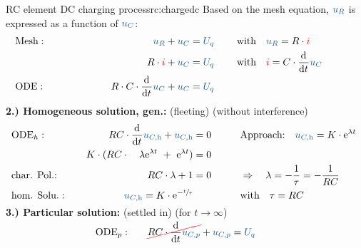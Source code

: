 {\begin{expl}{RC element DC charging process}{rc:chargedc}
        Based on the mesh equation, $\ecv{u_R}$ is expressed as a function of $\ecv{u_C}$:%
        \begingroup%
            \addtolength{\jot}{2pt}%
        \begin{align*}
            &\text{Mesh}:&&&
                \ecv{u_R} + \ecv{u_C}  &= \ecv{U_q}&&&
                &\text{with}\quad \ecv{u_R} = R \cdot \eci{i} \\
            &&&&
                R \cdot {\color{red} i} + \ecv{u_C}    &= \ecv{U_q}&&&
                &\text{with}\quad \eci{i} = C \cdot \dt \ecv{u_C} \\
            &\text{ODE}:&&&
                R \cdot C \cdot \dt \ecv{u_C}  + \ecv{u_C}   &= \ecv{U_q}
                \\[-15pt]&\hphantom{R1ooooooo}&&&\hphantom{L3oooooooooooooooooooo}&\hphantom{R3ooo}&&&&\hphantom{R5oooooooooooooooooooooo}\nonumber%
            \end{align*}%
        \textbf{2.) Homogeneous solution, gen.:} (fleeting) (without interference)%
        \begin{align*}%
            &\text{ODE}_{h}:&&&
                RC \cdot \dt \ecv{u_{C,\mathrm{h}}} + \ecv{u_{C,\mathrm{h}}} &= 0 &&&
                    &\text{Approach:}\quad
                    \ecv{u_{C,\mathrm{h}}} = K \cdot \mathrm{e}^{\lambda t}\\
            &&&&
                K \cdot(RC \cdot \quad\lambda \mathrm{e}^{\lambda t}\ +\ \mathrm{e}^{\lambda t}) &= 0 \\
            &\text{char. Pol.:}&&&
                RC \cdot \lambda + 1 &= 0 &&&
                    &\Rightarrow\quad \lambda = -\frac{1}{\tau} = -\frac{1}{RC}\\
            &\text{hom. Solu.}:&&&
                \ecv{u_{C,\mathrm{h}}} = K \cdot \mathrm{e}^{-\sfrac{t}{\tau}}&&&&
                    &\text{with}\quad \tau = RC
        \\[-15pt]&\hphantom{R1ooooooo}&&&\hphantom{L3oooooooooooooooooooo}&\hphantom{R3ooo}&&&&\hphantom{R5oooooooooooooooooooooo}\nonumber%
        \end{align*}%
        \textbf{3.) Particular solution:} (settled in) (for $t \to \infty$)%
        \begin{align*}%
            &\text{ODE}_{p}:&&&
                \redcancel{RC \cdot \dt \ecv{u_{C,p}}} + \ecv{u_{C,p}} &= \ecv{U_q} &&&

\end{align*}
\end{expl}}
